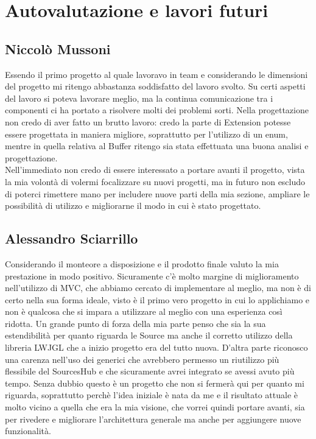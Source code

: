 \documentclass[a4paper,12pt]{report}
\begin{document}
\section{Autovalutazione e lavori futuri}
\subsection*{Niccolò Mussoni}
Essendo il primo progetto al quale lavoravo in team e considerando le dimensioni del progetto mi ritengo abbastanza soddisfatto del lavoro svolto. Su certi aspetti del lavoro si poteva lavorare meglio, ma la continua comunicazione tra i componenti ci ha portato a risolvere molti dei problemi sorti. Nella progettazione non credo di aver fatto un brutto lavoro: credo la parte di Extension potesse essere progettata in maniera migliore, soprattutto per l'utilizzo di un enum, mentre in quella relativa al Buffer ritengo sia stata effettuata una buona analisi e progettazione. 
\\Nell'immediato non credo di essere interessato a portare avanti il progetto, vista la mia volontà di volermi focalizzare su nuovi progetti, ma in futuro non escludo di poterci rimettere mano per includere nuove parti della mia sezione, ampliare le possibilità di utilizzo e migliorarne il modo in cui è stato progettato.
\subsection*{Alessandro Sciarrillo}
Considerando il monteore a disposizione e il prodotto finale valuto la mia prestazione in modo positivo.
Sicuramente c'è molto margine di miglioramento nell'utilizzo di MVC, che abbiamo cercato di implementare al meglio, ma non è di certo nella sua forma ideale, visto è il primo vero progetto in cui lo applichiamo e non è qualcosa che si impara a utilizzare al meglio con una esperienza così ridotta. Un grande punto di forza della mia parte penso che sia la sua estendibilità per quanto riguarda le Source ma anche il corretto utilizzo della libreria LWJGL che a inizio progetto era del tutto nuova. D'altra parte riconosco una carenza nell'uso dei generici che avrebbero permesso un riutilizzo più flessibile del SourcesHub e che sicuramente avrei integrato se avessi avuto più tempo.
Senza dubbio questo è un progetto che non si fermerà qui per quanto mi riguarda, soprattutto perchè l'idea iniziale è nata da me e il risultato attuale è molto vicino a quella che era la mia visione, che vorrei quindi portare avanti, sia per rivedere e migliorare l'architettura generale ma anche per aggiungere nuove funzionalità.
\end{document}
